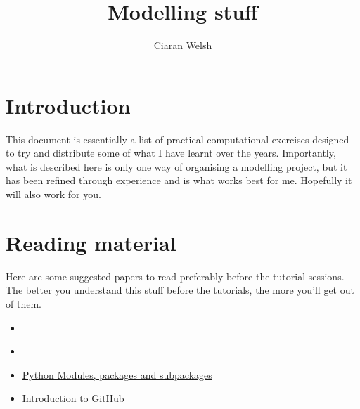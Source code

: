 \documentclass{article}
\title{Modelling stuff}
\author{Ciaran Welsh}
\begin{document}
    \maketitle
    \tableofcontents

    \section{Introduction}
    This document is essentially a list of practical computational exercises designed to try and distribute some of what
    I have learnt over the years. Importantly, what is described here is only one way of organising
    a modelling project, but it has been refined through experience and is what works best for me.
    Hopefully it will also work for you.

    \section{Reading material}
    Here are some suggested papers to read preferably before the tutorial sessions. The better you understand this
    stuff before the tutorials, the more you'll get out of them.
%
    \begin{itemize}
        \item \cite{raue2013lessons}
        \item \cite{alon2007network}
        \item \href{https://www.tutorialspoint.com/python/python_modules.htm}{Python Modules, packages and subpackages}
        \item \href{https://product.hubspot.com/blog/git-and-github-tutorial-for-beginners}{Introduction to GitHub}
    \end{itemize}

    
    

    
\end{document}
